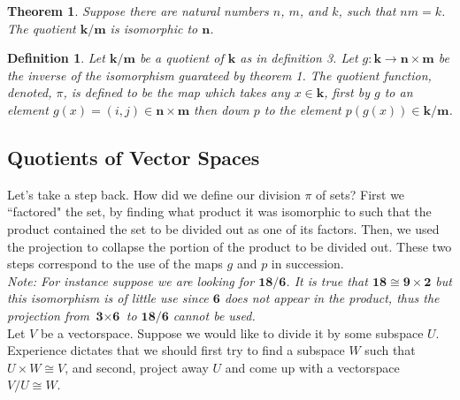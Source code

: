 \documentclass{article}
\theoremstyle{problemstyle}
\newtheorem{theorem}{Theorem}
\newtheorem{definition}{Definition}
\begin{document}
\begin{theorem}
Suppose there are natural numbers $n$, $m$, and $k$, such that $nm = k$. The quotient $\textbf{k/m}$ is isomorphic to $\textbf{n}$. 
\end{theorem}


\begin{definition}
Let $\textbf{k/m}$ be a quotient of $\textbf{k}$ as in definition 3. Let $g:\textbf{k} \rightarrow \textbf{n}\times \textbf{m}$ be the inverse of the isomorphism guarateed by theorem 1. The quotient function, denoted, $\pi$, is defined to be the map which takes any $x \in \textbf{k}$, first by $g$ to an element  $g(x) = (i,j) \in \textbf{n}\times\textbf{m}$ then down $p$ to the element $p(g(x)) \in \textbf{k/m}$.

\begin{center}
\end{center}
\end{definition}

\subsection*{Quotients of Vector Spaces}
 
Let's take a step back. How did we define our division $\pi$ of sets? First we ``factored" the set, by finding what product it was isomorphic to such that the product contained the set to be divided out as one of its factors. Then, we used the projection to collapse the portion of the product to be divided out. These two steps correspond to the use of the maps $g$ and $p$ in succession.\\ 

\textit{Note: For instance suppose we are looking for $\textbf{18/6}$. It is true that $\textbf{18} \cong \textbf{9}\times \textbf{2}$ but this isomorphism is of little use since $\textbf{6}$ does not appear in the product, thus the projection from $\textbf{3}\times \textbf{6}$ to $\textbf{18/6}$ cannot be used.}\\

Let $V$ be a vectorspace.  Suppose we would like to divide it by some subspace $U$. Experience dictates that we should first try to find a subspace $W$ such that $U \times W \cong V$, and second, project away $U$ and come up with a vectorspace $V/U \cong W$.\\
\end{document}
